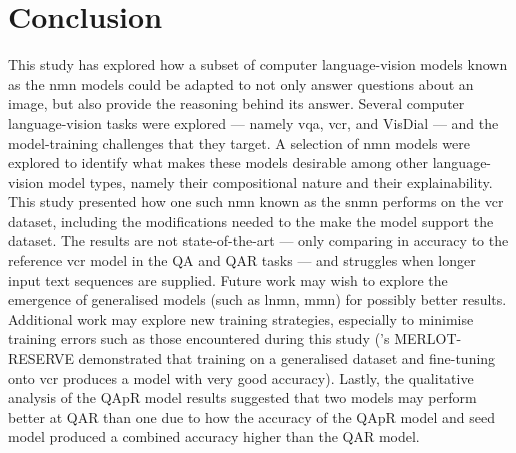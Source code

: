 \chapter{Conclusion}
\label{chp:conclusion}

This study has explored how a subset of computer language-vision models known as the \gls{nmn} models could be adapted to not only answer questions about an image, but also provide the reasoning behind its answer.
Several computer language-vision tasks were explored --- namely \gls{vqa}, \gls{vcr}, and VisDial --- and the model-training challenges that they target.
A selection of \gls{nmn} models were explored to identify what makes these models desirable among other language-vision model types, namely their compositional nature and their explainability.
This study presented how one such \gls{nmn} known as the \gls{snmn} performs on the \gls{vcr} dataset, including the modifications needed to the make the model support the dataset.
The results are not state-of-the-art --- only comparing in accuracy to the reference \gls{vcr} model in the Q\rightarrow{}A and QA\rightarrow{}R tasks --- and struggles when longer input text sequences are supplied.
Future work may wish to explore the emergence of generalised models (such as \gls{lnmn}, \gls{mmn}) for possibly better results.
Additional work may explore new training strategies, especially to minimise training errors such as those encountered during this study (\citeauthor{zellers_merlot_2022}'s MERLOT-RESERVE demonstrated that training on a generalised dataset and fine-tuning onto \gls{vcr} produces a model with very good accuracy).
Lastly, the qualitative analysis of the QAp\rightarrow{}R model results suggested that two models may perform better at Q\rightarrow{}AR than one due to how the accuracy of the QAp\rightarrow{}R model and seed model produced a combined accuracy higher than the Q\rightarrow{}AR model.

